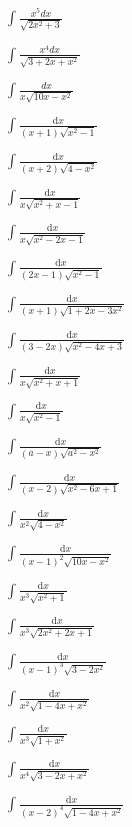 \begin{multicols}{2}
$\displaystyle \int \frac{x^5dx}{\sqrt{2x^2+3}}$

$\displaystyle \int \frac{x^4dx}{\sqrt{3+2x+x^2}}$

$\displaystyle \int \frac{dx}{x\sqrt{10x-x^2}}$

$\displaystyle \int{\frac{\mbox{d}x}{(x+1)\sqrt{x^2-1}}}$

$\displaystyle \int{\frac{\mbox{d}x}{(x+2)\sqrt{4-x^2}}}$

$\displaystyle \int{\frac{\mbox{d}x}{x\sqrt{x^2+x-1}}}$

$\displaystyle \int{\frac{\mbox{d}x}{x\sqrt{x^2-2x-1}}}$

$\displaystyle \int{\frac{\mbox{d}x}{(2x-1)\sqrt{x^2-1}}}$

$\displaystyle \int{\frac{\mbox{d}x}{(x+1)\sqrt{1+2x-3x^2}}}$

$\displaystyle \int{\frac{\mbox{d}x}{(3-2x)\sqrt{x^2-4x+3}}}$

$\displaystyle \int{\frac{\mbox{d}x}{x\sqrt{x^2+x+1}}}$

$\displaystyle \int{\frac{\mbox{d}x}{x\sqrt{x^2-1}}}$

$\displaystyle \int{\frac{\mbox{d}x}{(a-x)\sqrt{a^2-x^2}}}$

$\displaystyle \int{\frac{\mbox{d}x}{\left(x-2\right)\sqrt{x^2-6x+1}}}$

$\displaystyle \int{\frac{\mbox{d}x}{x^2\sqrt{4-x^2}}}$

$\displaystyle \int{\frac{\mbox{d}x}{(x-1)^2\sqrt{10x-x^2}}}$

$\displaystyle \int{\frac{\mbox{d}x}{x^3\sqrt{x^2+1}}}$

$\displaystyle \int{\frac{\mbox{d}x}{x^3\sqrt{2x^2+2x+1}}}$

$\displaystyle \int{\frac{\mbox{d}x}{(x-1)^3\sqrt{3-2x^2}}}$

$\displaystyle \int{\frac{\mbox{d}x}{x^2\sqrt{1-4x+x^2}}}$

$\displaystyle \int{\frac{\mbox{d}x}{x^3\sqrt{1+x^2}}}$

$\displaystyle \int{\frac{\mbox{d}x}{x^4\sqrt{3-2x+x^2}}}$

$\displaystyle \int{\frac{\mbox{d}x}{(x-2)^4\sqrt{1-4x+x^2}}}$
\end{multicols}

